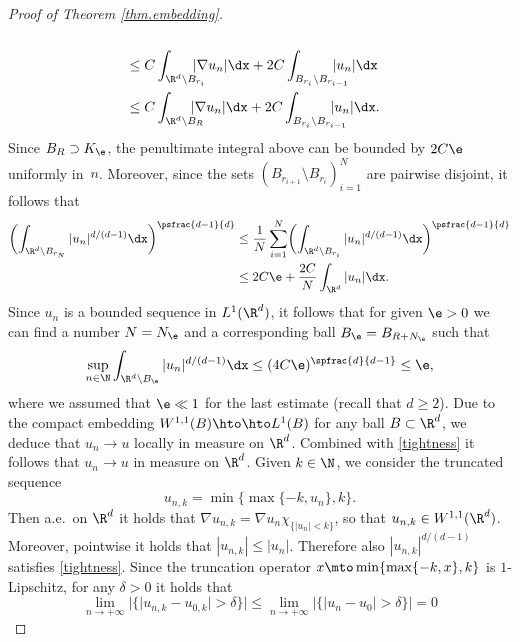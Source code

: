 \begin{proof}[Proof of Theorem \ref{thm.embedding}]
\begin{align*}
\\[-3pt]
&\leq C\int_{\R^d\setminus B_{r_{i}}}\hspace*{-4mm}|\nabla u_n|\dx+2C\int_{B_{r_{i}}\setminus B_{r_{i-1}}}\hspace*{-5mm}|u_n|\dx
\\
&\leq C\int_{\R^d\setminus B_{R}}\hspace*{-4mm}|\nabla u_n|\dx+2C\int_{B_{r_{i}}\setminus B_{r_{i-1}}}\hspace*{-5mm}|u_n|\dx.
\end{align*}
Since $B_R\supset K_{\e}$, the penultimate integral above can be bounded by $2C\e$ uniformly in~$n$. Moreover, since the sets $(B_{r_{i+1}}\setminus B_{r_i})_{i=1}^N$ are pairwise disjoint, it follows that
\begin{align*}
\biggl(\int_{\R^d\setminus B_{r_N}}|u_{n}|^{d/(d-1)}\dx\biggr)^{\psfrac{d-1}{d}}&\leq \frac{1}{N}\sum_{i=1}^N \biggl(\int_{\R^d\setminus B_{r_i}}|u_{n}|^{d/(d-1)}\dx\biggr)^{\psfrac{d-1}{d}}
\\
&\leq 2C\e+\frac{2C}{N}\int_{\R^d}|u_n|\dx.
\end{align*}
Since $u_n$ is a bounded sequence in $L^1(\R^d)$, it follows that for given $\e>0$ we can find a number $N=N_{\e}$ and a corresponding ball $B_{\e}=B_{R+N_{\e}}$ such that
\begin{equation}\label{tightness}
\sup_{n\in\N}\int_{\R^d\setminus B_{\e}}|u_n|^{d/(d-1)}\dx\leq (4C\e)^{\spfrac{d}{d-1}}\leq \e,
\end{equation}
where we assumed that $\e\ll 1$ for the last estimate (recall that $d\geq 2$). Due to the compact embedding $W^{1,1}(B)\hto\hto L^1(B)$ for any ball $B\subset\R^d$, we deduce that $u_n\to u$ locally in measure on $\R^d$. Combined with \eqref{tightness} it follows that $u_n\to u$ in measure on $\R^d$. Given $k\in\N$, we consider the truncated sequence\vspace*{-3pt}
\begin{equation*}
u_{n,k}=\min\{\max\{-k,u_n\},k\}.
\end{equation*}
Then a.e.\ on $\R^d$ it holds that $\nabla u_{n,k}=\nabla u_n\chi_{\{|u_n|< k\}}$, so that $u_{n,k}\in W^{1,1}(\R^d)$. Moreover, pointwise it holds that $|u_{n,k}|\leq |u_n|$. Therefore also $|u_{n,k}|^{d/(d-1)}$ satisfies \eqref{tightness}. Since the truncation operator $x\mto \min\{\max\{-k,x\},k\}$ is $1$-Lipschitz, for any $\delta>0$ it holds that\vspace*{-3pt}
\begin{equation*}
\lim_{n\to +\infty}|\{|u_{n,k}-u_{0,k}|>\delta\}|\leq \lim_{n\to +\infty}|\{|u_n-u_0|>\delta\}|=0

\end{equation*}
\end{proof}
